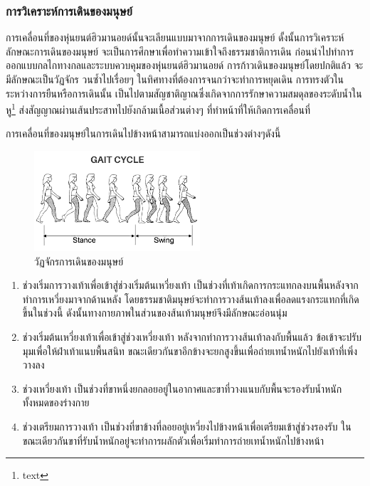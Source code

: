 \subsubsection{การวิเคราะห์การเดินของมนุษย์}
การเคลื่อนที่ของหุ่นยนต์ฮิวมานอยด์นั้นจะเลียนแบบมาจากการเดินของมนุษย์
ดั้งนั้นการวิเคราะห์ลักษณะการเดินของมนุษย์ จะเป็นการศึกษาเพื่อทำความเข้าใจถึงธรรมชาติการเดิน
ก่อนนำไปทำการออกแบบกลไกทางกลและระบบควบคุมของหุ่นยนต์ฮิวมานอยด์
การก้าวเดินของมนุษย์โดยปกติแล้ว จะมีลักษณะเป็นวัฏจักร วนซ้ำไปเรื่อยๆ ในทิศทางที่ต้องการจนกว่าจะทำการหยุดเดิน
การทรงตัวในระหว่างการยืนหรือการเดินนั้น เป็นไปตามสัญชาติญาณซึ่งเกิดจากการรักษาความสมดุลของระดับน้ำในหู\footnote{text}
ส่งสัญญาณผ่านเส้นประสาทไปยังกล้ามเนื้อส่วนต่างๆ ที่ทำหน้าที่ให้เกิดการเคลื่อนที่

การเคลื่อนที่ของมนุษย์ในการเดินไปข้างหน้าสามารถแบ่งออกเป็นช่วงต่างๆดังนี้
\begin{figure}[htbp]
	\centering
	\includegraphics[width=0.55\textwidth]{chapter2/images/gaitcycle.png}
	\caption{วัฏจักรการเดินของมนุษย์}
	\label{fig:human_gait_cycle}
\end{figure}
\begin{enumerate}[label=\arabic*., leftmargin=1.5cm]
	\item ช่วงเริ่มการวางเท้าเพื่อเข้าสู่ช่วงเริ่มต้นเหวี่ยงเท้า เป็นช่วงที่เท้าเกิดการกระแทกลงบนพื้นหลังจากทำการเหวี่ยงมาจากด้านหลัง
	      โดยธรรมชาติมนุษย์จะทำการวางส้นเท้าลงเพื่อลดแรงกระแทกที่เกิดขึ้นในช่วงนี้
	      ดังนั้นทางกายภาพในส่วนของส้นเท้ามนุษย์จึงมีลักษณะอ่อนนุ่ม
	\item ช่วงเริ่มต้นเหวี่ยงเท้าเพื่อเข้าสู่ช่วงเหวี่ยงเท้า หลังจากทำการวางส้นเท้าลงกับพื้นแล้ว ข้อเข้าจะปรับมุมเพื่อให้ฝ่าเท้าแนบพื้นสนิท
	      ขณะเดียวกันขาอีกข้างจะยกสูงขึ้นเพื่อถ่ายเทน้ำหนักไปยังเท้าที่เพิ่งวางลง
	\item ช่วงเหวี่ยงเท้า เป็นช่วงที่ขาหนึ่งยกลอยอยู่ในอากาศและขาที่วางแนบกับพื้นจะรองรับน้ำหนักทั้งหมดของร่างกาย
	\item ช่วงเตรียมการวางเท้า เป็นช่วงที่ขาข้างที่ลอยอยู่เหวี่ยงไปข้างหน้าเพื่อเตรียมเข้าสู่ช่วงรองรับ 
	      ในขณะเดียวกันขาที่รับน้ำหนักอยู่จะทำการผลักตัวเพื่อเริ่มทำการถ่ายเทน้ำหนักไปข้างหน้า
\end{enumerate}

